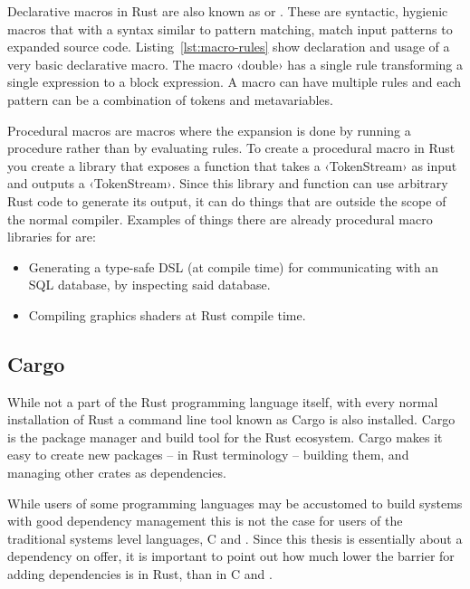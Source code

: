 Declarative macros in Rust are also known as  or . These are syntactic, hygienic macros that with a syntax similar to pattern matching, match input patterns to expanded source code. Listing~\ref{lst:macro-rules} show declaration and usage of a very basic declarative macro. The macro ‹double› has a single rule transforming a single expression to a block expression. A macro can have multiple rules and each pattern can be a combination of tokens and metavariables.

Procedural macros are macros where the expansion is done by running a procedure rather than by evaluating rules. To create a procedural macro in Rust you create a library that exposes a function that takes a ‹TokenStream› as input and outputs a ‹TokenStream›. Since this library and function can use arbitrary Rust code to generate its output, it can do things that are outside the scope of the normal compiler. Examples of things there are already procedural macro libraries for are:

\begin{itemize}
  \item Generating a type-safe DSL (at compile time) for communicating with an SQL database, by inspecting said database.\cite{diesel}
  \item Compiling graphics shaders at Rust compile time.\cite{vulkano}
\end{itemize}


\subsection{Cargo}

While not a part of the Rust programming language itself, with every normal installation of Rust a command line tool known as Cargo is also installed. Cargo is the package manager and build tool for the Rust ecosystem. Cargo makes it easy to create new packages --  in Rust terminology -- building them, and managing other crates as dependencies.

While users of some programming languages may be accustomed to build systems with good dependency management this is not the case for users of the traditional systems level languages, C and \cpp. Since this thesis is essentially about a dependency on offer, it is important to point out how much lower the barrier for adding dependencies is in Rust, than in C and \cpp.

